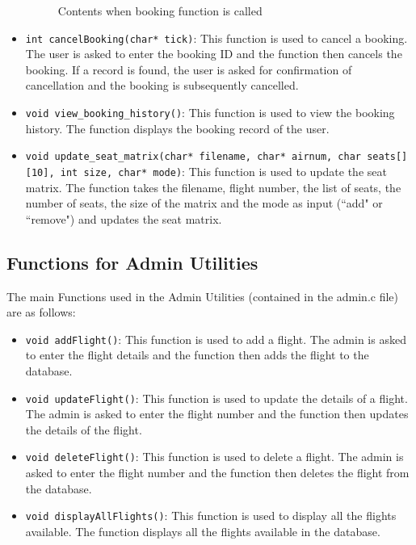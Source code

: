 \documentclass[a4paper]{scrartcl}
\begin{document}
\begin{itemize}
\begin{figure}[H]
        \caption{Contents when booking function is called}
    \end{figure}
    \item \texttt{int cancelBooking(char* tick)}: This function is used to cancel a booking. The user is asked to enter the booking ID and the function then cancels the booking. If a record is found, the user is asked for confirmation of cancellation and the booking is subsequently cancelled. \\
    \item \texttt{void view\_booking\_history()}: This function is used to view the booking history. The function displays the booking record of the user.\\
    \item \texttt{void update\_seat\_matrix(char* filename, char* airnum, char seats[][10], int size, char* mode)}: This function is used to update the seat matrix. The function takes the filename, flight number, the list of seats, the number of seats, the size of the matrix and the mode as input (``add" or ``remove") and updates the seat matrix.\\
\end{itemize}
\subsection{Functions for Admin Utilities}
The main Functions used in the Admin Utilities (contained in the admin.c file) are as follows:
\begin{itemize}
    \item \texttt{void addFlight()}: This function is used to add a flight. The admin is asked to enter the flight details and the function then adds the flight to the database.\\
    \item \texttt{void updateFlight()}: This function is used to update the details of a flight. The admin is asked to enter the flight number and the function then updates the details of the flight.\\
    \item \texttt{void deleteFlight()}: This function is used to delete a flight. The admin is asked to enter the flight number and the function then deletes the flight from the database.\\
    \item \texttt{void displayAllFlights()}: This function is used to display all the flights available. The function displays all the flights available in the database.\\
\end{itemize}
\end{document}
